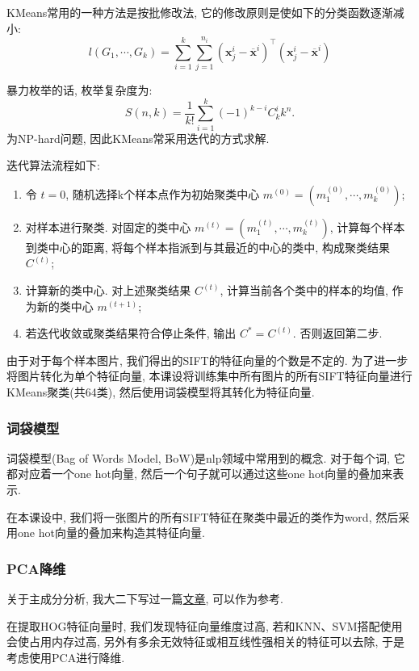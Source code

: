 \documentclass[lang=cn,12pt,a4paper,cite=authoryear]{elegantpaper}
\begin{document}
KMeans常用的一种方法是按批修改法, 它的修改原则是使如下的分类函数逐渐减小:
\begin{equation*}
    l(G_1,\cdots, G_k) = \sum_{i=1}^k \sum_{j=1}^{n_i}(\bm{x}_j^i-\overline{\bm{x}}^i)^\top(\bm{x}_j^i-\overline{\bm{x}}^i)
\end{equation*}

暴力枚举的话, 枚举复杂度为:
\begin{equation*}
    S(n, k) = \frac{1}{k!}\sum_{i=1}^k(-1)^{k-i}C_k^i k^n.   
\end{equation*}
为NP-hard问题, 因此KMeans常采用迭代的方式求解.

迭代算法流程如下:
\begin{enumerate}
    \item 令 $t=0$, 随机选择k个样本点作为初始聚类中心 $m^{(0)}=(m_1^{(0)}, \cdots, m_k^{(0)})$;
    \item 对样本进行聚类. 对固定的类中心 $m^{(t)}=(m_1^{(t)}, \cdots, m_k^{(t)})$, 计算每个样本到类中心的距离, 将每个样本指派到与其最近的中心的类中, 构成聚类结果 $C^{(t)}$;
    \item 计算新的类中心. 对上述聚类结果 $C^{(t)}$, 计算当前各个类中的样本的均值, 作为新的类中心 $m^{(t+1)}$;
    \item 若迭代收敛或聚类结果符合停止条件, 输出 $C^{*}=C^{(t)}$. 否则返回第二步.
\end{enumerate}

由于对于每个样本图片, 我们得出的SIFT的特征向量的个数是不定的. 为了进一步将图片转化为单个特征向量, 本课设将训练集中所有图片的所有SIFT特征向量进行KMeans聚类(共64类), 然后使用词袋模型将其转化为特征向量.

\subsubsection{词袋模型}
词袋模型(Bag of Words Model, BoW)是nlp领域中常用到的概念. 对于每个词, 它都对应着一个one hot向量, 然后一个句子就可以通过这些one hot向量的叠加来表示.

在本课设中, 我们将一张图片的所有SIFT特征在聚类中最近的类作为word, 然后采用one hot向量的叠加来构造其特征向量.

\subsubsection{PCA降维}
关于主成分分析, 我大二下写过一篇\href{https://zhuanlan.zhihu.com/p/625837046}{文章}, 可以作为参考.

在提取HOG特征向量时, 我们发现特征向量维度过高, 若和KNN、SVM搭配使用会使占用内存过高, 另外有多余无效特征或相互线性强相关的特征可以去除, 于是考虑使用PCA进行降维.
\end{document}
